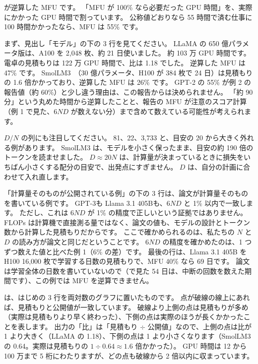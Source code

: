 
 が逆算した MFU です。
「MFU が 100\% なら必要だった GPU 時間」を、実際にかかった GPU 時間で割っています。
公称値どおりなら 55 時間で済む仕事に 100 時間かかったなら、MFU は 55\% です。


まず、見出し「モデル」の下の 3 行を見てください。
LLaMA の 650 億パラメータ版は、A100 を 2,048 枚、約 21 日使いました\cite{touvron2023llama}。
約 103 万 GPU 時間です。
電卓の見積もりは 122 万 GPU 時間で、比は 1.18 でした。
逆算した MFU は 47\% です。
SmolLM3~\cite{huggingface2025smollm3}（30 億パラメータ、H100 が 384 枚で 24 日）は見積もりの 1.6 倍かかっており、逆算した MFU は 26\% です。
GPT-2 の 55\% が例 2 の報告値（約 60\%）と少し違う理由は、この報告からは決められません。
「約 90 分」という丸めた時間から逆算したことと、報告の MFU が注意のスコア計算（例 1 で見た、$6ND$ が数えない分）まで含めて数えている可能性が考えられます。

$D/N$ の列にも注目してください。
81、22、3,733 と、目安の 20 から大きく外れる例があります。
SmolLM3 は、モデルを小さく保ったまま、目安の約 190 倍のトークンを読ませました。
$D\approx20N$ は、計算量が決まっているときに損失をいちばん小さくする配分の目安で、出発点にすぎません。
$D$ は、自分の計画に合わせて入れ直します。

「計算量そのものが公開されている例」の下の 3 行は、論文が計算量そのものを書いている例です。
GPT-3\cite{brown2020language}も Llama 3.1 405B\cite{dubey2024llama3}も、$6ND$ と 1\% 以内で一致します。
ただし、これは $6ND$ が 1\% の精度で正しいという証拠ではありません。
FLOPs は計算機で直接測る量ではなく、論文の値も、モデルの設計とトークン数から計算した見積もりだからです。
ここで確かめられるのは、私たちの $N$ と $D$ の読み方が論文と同じだということです。
$6ND$ の精度を確かめたのは、1 つずつ数えた値と比べた例 1（6\% の差）です。
最後の行は、Llama 3.1 405B を H100 16,000 枚で学習する日数の見積もりで、MFU 40\% なら 69 日です。
論文は学習全体の日数を書いていないので（で見た 54 日は、中断の回数を数えた期間です）、この例では MFU を逆算できません。

は、はじめの 3 行を両対数のグラフに置いたものです。
点が破線の線上にあれば、見積もりと公開値が一致しています。
破線より上側の点は見積もりが多め（実際は見積もりより早く終わった）、下側の点は実際のほうが長くかかったことを表します。
出力の「比」は「見積もり $\div$ 公開値」なので、上側の点は比が 1 より大きく（LLaMA の 1.18）、下側の点は 1 より小さくなります（SmolLM3 の 0.64。実際は見積もりの $1\div0.64\approx1.6$ 倍かかった）。
GPU 時間は 12 から 100 万まで 5 桁にわたりますが、どの点も破線から 2 倍以内に収まっています。

